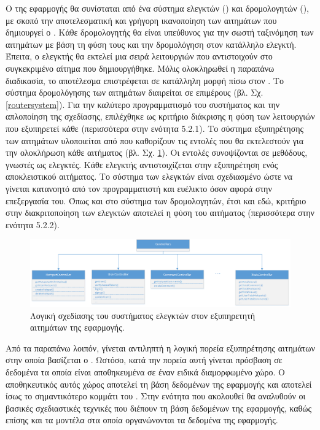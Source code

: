 Ο  της εφαρμογής θα συνίσταται από ένα σύστημα ελεγκτών () και δρομολογητών (), με σκοπό την αποτελεσματική και γρήγορη ικανοποίηση των αιτημάτων που δημιουργεί ο . Κάθε δρομολογητής θα είναι υπεύθυνος για την σωστή ταξινόμηση των αιτημάτων με βάση τη φύση τους και την δρομολόγηση στον κατάλληλο ελεγκτή. Έπειτα, ο ελεγκτής θα εκτελεί μια σειρά λειτουργιών που αντιστοιχούν στο συγκεκριμένο αίτημα που δημιουργήθηκε. Μόλις ολοκληρωθεί η παραπάνω διαδικασία, το αποτέλεσμα επιστρέφεται σε κατάλληλη μορφή πίσω στον .
\newline
\indent
Το σύστημα δρομολόγησης των αιτημάτων διαιρείται σε επιμέρους  (βλ. Σχ. \ref{routersystem}). Για την καλύτερο προγραμματισμό του συστήματος και την απλοποίηση της σχεδίασης, επιλέχθηκε ως κριτήριο διάκρισης η φύση των λειτουργιών που εξυπηρετεί κάθε  (περισσότερα στην ενότητα 5.2.1).
\newline
\indent
Το σύστημα εξυπηρέτησης των αιτημάτων υλοποιείται από  που καθορίζουν τις εντολές που θα εκτελεστούν για την ολοκλήρωση κάθε αιτήματος (βλ. Σχ. \ref{controllersystem}). Οι εντολές συνοψίζονται σε μεθόδους, γνωστές ως ελεγκτές. Κάθε ελεγκτής αντιστοιχίζεται στην εξυπηρέτηση ενός αποκλειστικού αιτήματος. Το σύστημα των ελεγκτών είναι σχεδιασμένο ώστε να γίνεται κατανοητό από τον προγραμματιστή και ευέλικτο όσον αφορά στην επεξεργασία του. Όπως και στο σύστημα των δρομολογητών, έτσι και εδώ, κριτήριο στην διακριτοποίηση των ελεγκτών αποτελεί η φύση του αιτήματος (περισσότερα στην ενότητα 5.2.2).

\begin{figure}[H]
    \centering
    \includegraphics[scale=0.4]{figures/controller-system.png}
    \caption{Λογική σχεδίασης του συστήματος ελεγκτών στον εξυπηρετητή αιτημάτων της εφαρμογής.}
    \label{controllersystem}
\end{figure}

Από τα παραπάνω λοιπόν, γίνεται αντιληπτή η λογική πορεία εξυπηρέτησης αιτημάτων στην οποία βασίζεται ο . Ωστόσο, κατά την πορεία αυτή γίνεται πρόσβαση σε δεδομένα τα οποία είναι αποθηκευμένα σε έναν ειδικά διαμορφωμένο χώρο. Ο αποθηκευτικός αυτός χώρος αποτελεί τη βάση δεδομένων της εφαρμογής και αποτελεί ίσως το σημαντικότερο κομμάτι του . Στην ενότητα που ακολουθεί θα αναλυθούν οι βασικές σχεδιαστικές τεχνικές που διέπουν τη βάση δεδομένων  της εφαρμογής, καθώς επίσης και τα μοντέλα στα οποία οργανώνονται τα δεδομένα της εφαρμογής.


